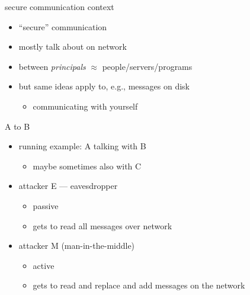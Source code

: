\begin{frame}{secure communication context}
    \begin{itemize}
    \item ``secure'' communication
    \item mostly talk about on network
    \item between \textit{principals} $\approx$ people/servers/programs
    \vspace{.5cm}
    \item but same ideas apply to, e.g., messages on disk
        \begin{itemize}
        \item communicating with yourself
        \end{itemize}
    \end{itemize}
\end{frame}

\begin{frame}{A to B}
    \begin{itemize}
    \item running example: A talking with B
        \begin{itemize}
        \item maybe sometimes also with C
        \end{itemize}
    \item attacker E --- eavesdropper
        \begin{itemize}
        \item passive
        \item gets to read all messages over network
        \end{itemize}
    \item attacker M (man-in-the-middle)
        \begin{itemize}
        \item active
        \item gets to read and replace and add messages on the network
        \end{itemize}
    \end{itemize}
\end{frame}

